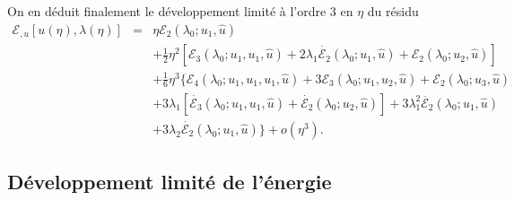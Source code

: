\documentclass{article}
\newcommand{\nobracket}{}
\newcommand{\nosymbol}{}
\begin{document}
On en d{\'e}duit finalement le d{\'e}veloppement limit{\'e} {\`a} l'ordre 3 en
$\eta$ du r{\'e}sidu
\begin{eqnarray}
  \mathcal{E}_{, u} [u (\eta), \lambda (\eta)] & = & \eta \mathcal{E}_2
  (\lambda_0 ; u_1, \hat{u}) \nonumber\\
  &  & \nosymbol + \tfrac{1}{2} \eta^2  [\mathcal{E}_3 (\lambda_0 ; u_1, u_1,
  \hat{u}) + 2 \lambda_1  \dot{\mathcal{E}_2} (\lambda_0 ; u_1, \hat{u})
  +\mathcal{E}_2 (\lambda_0 ; u_2, \hat{u})] \nonumber\\
  &  & \nosymbol + \tfrac{1}{6} \eta^3  \{ \mathcal{E}_4 (\lambda_0 ; u_1,
  u_1, u_1, \hat{u}) + 3\mathcal{E}_3 (\lambda_0 ; u_1, u_2, \hat{u})
  \nobracket +\mathcal{E}_2 (\lambda_0 ; u_3, \hat{u}) \nonumber\\
  &  & \nosymbol + 3 \lambda_1  [\dot{\mathcal{E}_3} (\lambda_0 ; u_1, u_1,
  \hat{u}) + \dot{\mathcal{E}_2} (\lambda_0 ; u_2, \hat{u})] + 3 \lambda_1^2
  \ddot{\mathcal{E}_2} (\lambda_0 ; u_1, \hat{u}) \nonumber\\
  &  & \nobracket \nosymbol + 3 \lambda_2  \dot{\mathcal{E}_2} (\lambda_0 ;
  u_1, \hat{u}) \} + o (\eta^3) .  \label{eq20220107080901}
\end{eqnarray}
\subsection{D{\'e}veloppement limit{\'e} de l'{\'e}nergie}\label{sec:DL
energie}
\end{document}
